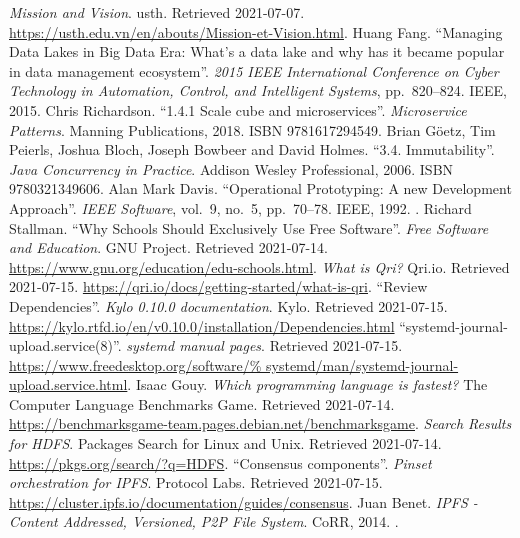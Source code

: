 \begin{thebibliography}{69}
   \emph{Mission and Vision}.
    \acrlong{usth}.  Retrieved 2021-07-07.
    \url{https://usth.edu.vn/en/abouts/Mission-et-Vision.html}.
   Huang Fang.
    ``Managing Data Lakes in Big Data Era: What's a data lake
    and why has it became popular in data management ecosystem''.
    \emph{2015 IEEE International Conference on Cyber Technology
    in Automation, Control, and Intelligent Systems}, pp.~820--824.
    IEEE, 2015.  
   Chris Richardson.
    ``1.4.1 Scale cube and microservices''.  \emph{Microservice Patterns}.
    Manning Publications, 2018.  ISBN 9781617294549.
   Brian Göetz, Tim Peierls, Joshua Bloch,
    Joseph Bowbeer and David Holmes.
    ``3.4. Immutability''.  \emph{Java Concurrency in Practice}.
    Addison Wesley Professional, 2006.  ISBN 9780321349606.
   Alan Mark Davis.
    ``Operational Prototyping: A new Development Approach''.
    \emph{IEEE Software}, vol.~9, no.~5, pp.~70--78.
    IEEE, 1992.  .
   Richard Stallman.
    ``Why Schools Should Exclusively Use Free Software''.
    \emph{Free Software and Education}.  GNU Project.  Retrieved 2021-07-14.
    \url{https://www.gnu.org/education/edu-schools.html}.
   \emph{What is Qri?} Qri.io.  Retrieved 2021-07-15.
    \url{https://qri.io/docs/getting-started/what-is-qri}.
   ``Review Dependencies''.  \emph{Kylo 0.10.0 documentation}.
    Kylo.  Retrieved 2021-07-15.
    \url{https://kylo.rtfd.io/en/v0.10.0/installation/Dependencies.html}
   ``systemd-journal-upload.service(8)''.
    \emph{systemd manual pages}.  Retrieved 2021-07-15.
    \url{https://www.freedesktop.org/software/%
         systemd/man/systemd-journal-upload.service.html}.
   Isaac Gouy.
    \emph{Which programming language is fastest?}
    The Computer Language Benchmarks Game.
    Retrieved 2021-07-14.
    \url{https://benchmarksgame-team.pages.debian.net/benchmarksgame}.
   \emph{Search Results for HDFS}.
    Packages Search for Linux and Unix.
    Retrieved 2021-07-14.  \url{https://pkgs.org/search/?q=HDFS}.
   ``Consensus components''.
    \emph{Pinset orchestration for IPFS}.
    Protocol Labs.  Retrieved 2021-07-15.
    \url{https://cluster.ipfs.io/documentation/guides/consensus}.
   Juan Benet.
    \emph{IPFS - Content Addressed, Versioned, P2P File System}.
    CoRR, 2014.  .
\end{thebibliography}
